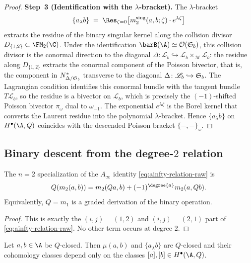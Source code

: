 \begin{proof}
\smallskip
\noindent\textbf{Step~3 (Identification with the $\lambda$-bracket).}
The $\lambda$-bracket
\[
\{a_\lambda b\}
\;=\;
\Res_{\zeta=0}\bigl[m_2^{\mathrm{sing}}(a,b;\zeta)\cdot e^{\lambda\zeta}\bigr]
\]
extracts the residue of the binary singular kernel along the collision
divisor $D_{\{1,2\}} \subset \FM_2(\C)$. Under the identification
$\barB(\A) \simeq \mathcal{O}(\Steinb_b)$, this collision divisor is
the conormal direction to the diagonal
$\Delta \colon \mathscr{L}_b \hookrightarrow
\mathscr{L}_b \times_{\mathscr{M}} \mathscr{L}_b$:
the residue along $D_{\{1,2\}}$ extracts the conormal component
of the Poisson bivector, that is, the component in
$N^*_{\Delta/\mathfrak{S}_b}$ transverse to the diagonal
$\Delta \colon \mathscr{L}_b \hookrightarrow \mathfrak{S}_b$.
The Lagrangian condition identifies this conormal bundle with the
tangent bundle $T\mathscr{L}_b$, so the residue is a bivector on
$\mathscr{L}_b$, which is precisely the $(-1)$-shifted Poisson
bivector $\pi_\omega$ dual to $\omega_{-1}$.
The exponential $e^{\lambda\zeta}$ is the Borel kernel that converts
the Laurent residue into the polynomial $\lambda$-bracket.
Hence $\{a_\lambda b\}$ on $H^\bullet(\A,Q)$ coincides with the
descended Poisson bracket $\{-,-\}_{\omega}$.
\end{proof}

\subsection{Binary descent from the degree-$2$ relation}

\begin{proposition}
\label{prop:m1_m2}
The $n=2$ specialization of the $A_\infty$ identity \eqref{eq:ainfty-relation-raw} is
\begin{equation}
\label{eq:repaired-n2}
Q(m_2(a,b))=m_2(Qa,b)+(-1)^{\degree{a}}m_2(a,Qb).
\end{equation}
Equivalently, $Q=m_1$ is a graded derivation of the binary operation.
\end{proposition}

\begin{proof}
This is exactly the $(i,j)=(1,2)$ and $(i,j)=(2,1)$ part of
\eqref{eq:ainfty-relation-raw}. No other term occurs at degree $2$.
\end{proof}

\begin{lemma}
\label{lem:lambda_descends}
Let $a,b\in\A$ be $Q$-closed. Then $\mu(a,b)$ and $\{a_\lambda b\}$ are $Q$-closed and
their cohomology classes depend only on the classes $[a],[b]\in H^\bullet(\A,Q)$.
\end{lemma}

